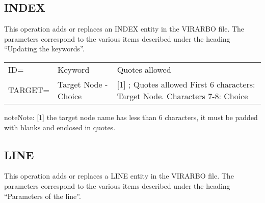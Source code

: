 \documentclass[letterpaper,10pt,english]{sphinxmanual}
\begin{document}
\subsection{INDEX}
\label{\detokenize{Installation_Guide:index}}\label{\detokenize{Installation_Guide:index-163}}
This operation adds or replaces an INDEX entity in the VIRARBO file. The parameters correspond to the various items described under the heading “Updating the keywords”.


\begin{savenotes}\sphinxattablestart
\centering
\begin{tabulary}{\linewidth}[t]{|T|T|T|}
\hline
{}\relax &\relax &\relax \\
\hline
ID=
&
Keyword
&
Quotes allowed
\\
\hline
TARGET=
&
Target Node -
Choice
&
{[}1{]} ; Quotes allowed
First 6 characters: Target Node.
Characters 7-8: Choice
\\
\hline
\end{tabulary}
\par
\sphinxattableend\end{savenotes}

\begin{sphinxadmonition}{note}{Note:}
{[}1{]} the target node name has less than 6 characters, it must be padded with blanks and enclosed in quotes.
\end{sphinxadmonition}


\subsection{LINE}
\label{\detokenize{Installation_Guide:line}}\label{\detokenize{Installation_Guide:index-164}}
This operation adds or replaces a LINE entity in the VIRARBO file. The parameters correspond to the various items described under the heading “Parameters of the line”.
\end{document}
